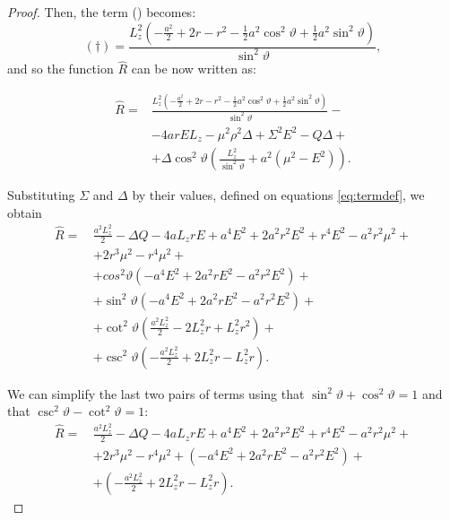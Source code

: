 \begin{proof}
	Then, the term (\dag) becomes:
	\[
	(\dag) = \frac{L_z^2 \left( -\frac{a^2}{2} + 2r - r^2 - \frac{1}{2}a^2\cos^2\vartheta + \frac{1}{2}a^2\sin^2\vartheta\right) }{\sin^2\vartheta},
	\]
	and so the function $\widehat{R}$ can be now written as:
	
	\begin{align}
	\widehat{R} =& \frac{L_z^2 \left( -\frac{a^2}{2} + 2r - r^2 - \frac{1}{2}a^2\cos^2\vartheta + \frac{1}{2}a^2\sin^2\vartheta\right) }{\sin^2\vartheta} - \nonumber\\
	&- 4 a r E L_z - \mu^2 \rho^2 \Delta + \Sigma^2 E^2 - Q \Delta + \nonumber \\ 
	&+ \Delta\cos^2\vartheta\left(\frac{L_z^2}{\sin^2\vartheta} + a^2\left(\mu^2 - E^2\right)\right).
	\end{align}
	
	Substituting $\Sigma$ and $\Delta$ by their values, defined on equations \ref{eq:termdef}, we obtain
	\begin{align}
	\widehat{R} =\,& \frac{a^2L_z^2}{2} - \Delta Q - 4aL_zrE + a^4E^2 + 2a^2r^2E^2 + r^4E^2 - a^2r^2\mu^2 + \nonumber \\
	&+ 2r^3\mu^2 - r^4\mu^2 + \nonumber\\
	&+ cos^2\vartheta\left(-a^4E^2 + 2a^2rE^2 - a^2r^2E^2 \right) + \nonumber \\
	&+ \sin^2\vartheta\left( -a^4E^2 + 2a^2rE^2 - a^2r^2E^2 \right) + \nonumber\\
	&+ \cot^2\vartheta\left( \frac{a^2L_z^2}{2} - 2L_z^2r + L_z^2r^2 \right) + \nonumber \\
	&+ \csc^2\vartheta\left( -\frac{a^2L_z^2}{2} + 2L_z^2r - L_z^2r \right).
	\end{align}
	
	We can simplify the last two pairs of terms using that $\sin^2 \vartheta + \cos^2 \vartheta = 1$ and that $\csc^2\vartheta - \cot^2\vartheta = 1$:
	\begin{align}
	\widehat{R} =\,& \frac{a^2L_z^2}{2} - \Delta Q - 4aL_zrE + a^4E^2 + 2a^2r^2E^2 + r^4E^2 - a^2r^2\mu^2 + \nonumber \\
	&+ 2r^3\mu^2 - r^4\mu^2 + \left(-a^4E^2 + 2a^2rE^2 - a^2r^2E^2 \right) + \nonumber \\
	&+ \left( -\frac{a^2L_z^2}{2} + 2L_z^2r - L_z^2r \right).
	\end{align}
	

\end{proof}
